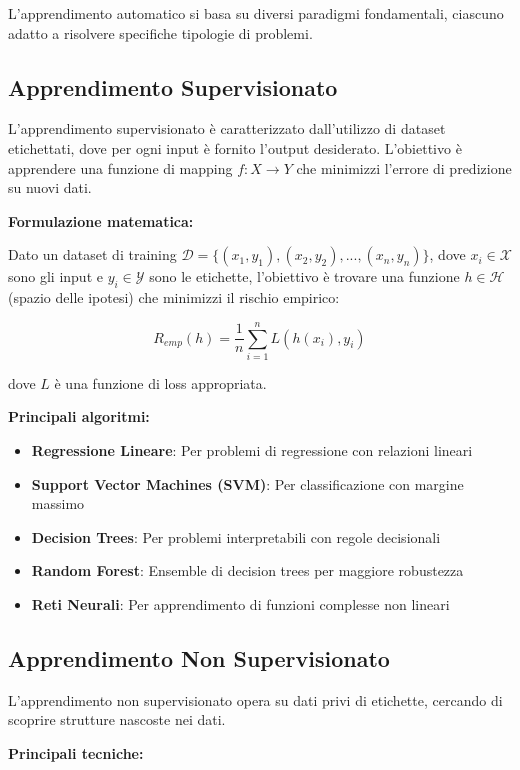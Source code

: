 \documentclass[12pt,a4paper,twoside]{report}
\begin{document}
L'apprendimento automatico si basa su diversi paradigmi fondamentali, ciascuno adatto a risolvere specifiche tipologie di problemi.

\subsection{Apprendimento Supervisionato}

L'apprendimento supervisionato è caratterizzato dall'utilizzo di dataset etichettati, dove per ogni input è fornito l'output desiderato. L'obiettivo è apprendere una funzione di mapping $f: X \rightarrow Y$ che minimizzi l'errore di predizione su nuovi dati.

\textbf{Formulazione matematica:}

Dato un dataset di training $\mathcal{D} = \{(x_1, y_1), (x_2, y_2), ..., (x_n, y_n)\}$, dove $x_i \in \mathcal{X}$ sono gli input e $y_i \in \mathcal{Y}$ sono le etichette, l'obiettivo è trovare una funzione $h \in \mathcal{H}$ (spazio delle ipotesi) che minimizzi il rischio empirico:

$$R_{emp}(h) = \frac{1}{n} \sum_{i=1}^{n} L(h(x_i), y_i)$$

dove $L$ è una funzione di loss appropriata.

\textbf{Principali algoritmi:}
\begin{itemize}
    \item \textbf{Regressione Lineare}: Per problemi di regressione con relazioni lineari
    \item \textbf{Support Vector Machines (SVM)}: Per classificazione con margine massimo
    \item \textbf{Decision Trees}: Per problemi interpretabili con regole decisionali
    \item \textbf{Random Forest}: Ensemble di decision trees per maggiore robustezza
    \item \textbf{Reti Neurali}: Per apprendimento di funzioni complesse non lineari
\end{itemize}

\subsection{Apprendimento Non Supervisionato}

L'apprendimento non supervisionato opera su dati privi di etichette, cercando di scoprire strutture nascoste nei dati.

\textbf{Principali tecniche:}
\end{document}
